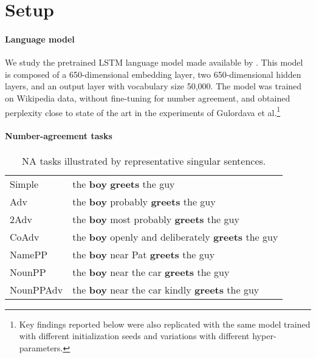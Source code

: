\section{Setup}\label{sec:the_data}

\paragraph{Language model}\label{ssec:lstm_lm}
We study the pretrained LSTM language model made available by
. This model is composed of a
650-dimensional embedding layer, two 650-dimensional hidden layers,
and an output layer with vocabulary size 50,000.
The model was trained on Wikipedia data, without fine-tuning for number
agreement, and obtained perplexity close to state of the art in the experiments of Gulordava et al.\footnote{Key findings reported below were also replicated with the same model trained with different initialization seeds and variations with different hyper-parameters.} 


\paragraph{Number-agreement tasks}
\begin{table}[tb]
  \centering
  \begin{footnotesize}
  \begin{tabular}{l@{\hskip1pt}l}
    \B Simple & the \textbf{boy} \textbf{greets} the guy\\
    \B Adv & the \textbf{boy} probably \textbf{greets} the guy\\
    \B 2Adv & the \textbf{boy} most probably \textbf{greets} the guy\\
    \B CoAdv &  the \textbf{boy} openly and deliberately \textbf{greets} the guy\\
    \B NamePP & the \textbf{boy} near Pat \textbf{greets} the guy\\
    \B NounPP & the \textbf{boy} near the car \textbf{greets} the guy\\
    \B NounPPAdv & the \textbf{boy} near the car kindly \textbf{greets} the guy\\
  \end{tabular}
  \end{footnotesize}
  \caption{NA tasks illustrated by representative
    singular sentences.}
  \label{tab:data-sets}
\end{table}

